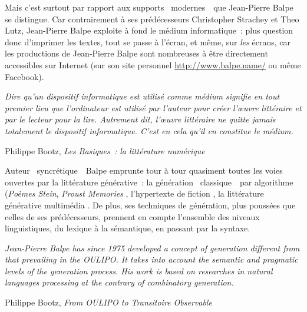 \documentclass{article}
\newenvironment{citationbox}
{\begin{center}
		\begin{minipage}{.8\textwidth}
		}
		{
		\end{minipage}	
\end{center}
}
\begin{document}
			Mais c'est surtout par rapport aux supports \guillemotleft~modernes~\guillemotright~que Jean-Pierre Balpe se distingue. Car contrairement à ses prédécesseurs Christopher Strachey et Theo Lutz, Jean-Pierre Balpe exploite à fond le médium informatique~: plus question donc d'imprimer les textes, tout se passe à l'écran, et même, sur \textit{les} écrans, car les productions de Jean-Pierre Balpe sont nombreuses à être directement accessibles sur Internet (sur son site personnel \href{http://www.balpe.name/}{http://www.balpe.name/} ou même Facebook).
			\begin{citationbox}
				\textit{Dire qu’un dispositif informatique est utilisé comme médium signifie en tout premier lieu que l’ordinateur est utilisé par l’auteur pour créer l’œuvre littéraire et par le lecteur pour la lire. Autrement dit, l’œuvre littéraire ne quitte jamais totalement le dispositif informatique. C’est en cela qu’il en constitue le médium.}
				\begin{flushright}
					Philippe Bootz, \textit{Les Basiques~: la littérature numérique} \autocite{bootz2006}
				\end{flushright}
			\end{citationbox}
			Auteur \guillemotleft~syncrétique~\guillemotright~Balpe emprunte tour à tour quasiment toutes les voies ouvertes par la littérature générative~: la génération \guillemotleft~classique~\guillemotright~par algorithme (\textit{Poèmes Stein}\autocite{balpe_stein}, \textit{Proust Memories} \autocite{balpe_proust}, l'hypertexte de fiction \autocite{balpe_disparition}, la littérature générative multimédia \autocite{balpe_videoseries}. De plus, ses techniques de génération, plus poussées que celles de ses prédécesseurs, prennent en compte l'ensemble des niveaux linguistiques, du lexique à la sémantique, en passant par la syntaxe.
			\begin{citationbox}
				\textit{Jean-Pierre Balpe has since 1975 developed a concept of generation different from that prevailing in the OULIPO. It takes into account the semantic and pragmatic levels of the generation process. His work is based on researches in natural languages processing at the contrary of combinatory generation.}
				\begin{flushright}
					Philippe Bootz, \textit{From OULIPO to Transitoire Observable} \autocite{bootz2012}
				\end{flushright}
			\end{citationbox}
			
\end{document}
